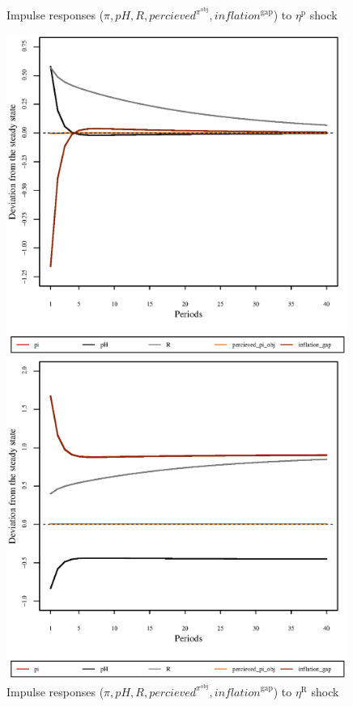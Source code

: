\begin{figure}[h]
\begin{minipage}{0.5\textwidth}
\caption{Impulse responses ($\pi, {p\!H}, R, {p\!e\!r\!c\!i\!e\!v\!e\!d}^{\pi^{\mathrm{obj}}}, {i\!n\!f\!l\!a\!t\!i\!o\!n}^{\mathrm{gap}}$) to $\eta^{\mathrm{p}}$ shock}
\end{minipage}
\end{figure}

\begin{figure}[h]
\begin{minipage}{0.5\textwidth}
\vspace*{-3em}
\centering
\includegraphics[width=0.99\textwidth, scale=0.55]{plots/plot_133.eps}
\caption{Impulse responses ($\pi, {p\!H}, R, {p\!e\!r\!c\!i\!e\!v\!e\!d}^{\pi^{\mathrm{obj}}}, {i\!n\!f\!l\!a\!t\!i\!o\!n}^{\mathrm{gap}}$) to $\eta^{\mathrm{R}}$ shock}
\end{minipage}
\begin{minipage}{0.5\textwidth}
\vspace*{-3em}
\centering
\includegraphics[width=0.99\textwidth, scale=0.55]{plots/plot_134.eps}

\end{minipage}
\end{figure}
